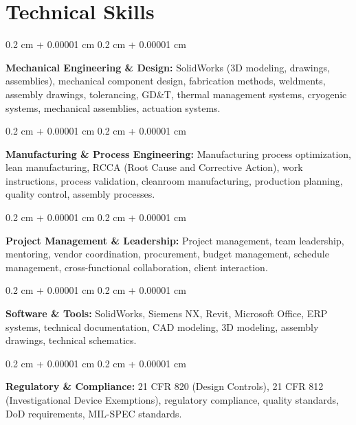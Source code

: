 \documentclass[10pt, letterpaper]{article}
\newenvironment{onecolentry}{
    \begin{adjustwidth}{
        0.2 cm + 0.00001 cm
    }{
        0.2 cm + 0.00001 cm
    }
}{
    \end{adjustwidth}
} %
\begin{document}
\vspace{0.4 cm}


    
    \section{Technical Skills}

        \begin{onecolentry}
            \textbf{Mechanical Engineering \& Design:} SolidWorks (3D modeling, drawings, assemblies), mechanical component design, fabrication methods, weldments, assembly drawings, tolerancing, GD\&T, thermal management systems, cryogenic systems, mechanical assemblies, actuation systems.
        \end{onecolentry}

        \vspace{0.2 cm}

        \begin{onecolentry}
            \textbf{Manufacturing \& Process Engineering:} Manufacturing process optimization, lean manufacturing, RCCA (Root Cause and Corrective Action), work instructions, process validation, cleanroom manufacturing, production planning, quality control, assembly processes.
        \end{onecolentry}

        \vspace{0.2 cm}

        \begin{onecolentry}
            \textbf{Project Management \& Leadership:} Project management, team leadership, mentoring, vendor coordination, procurement, budget management, schedule management, cross-functional collaboration, client interaction.
        \end{onecolentry}

        \vspace{0.2 cm}

        \begin{onecolentry}
            \textbf{Software \& Tools:} SolidWorks, Siemens NX, Revit, Microsoft Office, ERP systems, technical documentation, CAD modeling, 3D modeling, assembly drawings, technical schematics.
        \end{onecolentry}

        \vspace{0.2 cm}

        \begin{onecolentry}
            \textbf{Regulatory \& Compliance:} 21 CFR 820 (Design Controls), 21 CFR 812 (Investigational Device Exemptions), regulatory compliance, quality standards, DoD requirements, MIL-SPEC standards.
        \end{onecolentry}


    
\end{document}
